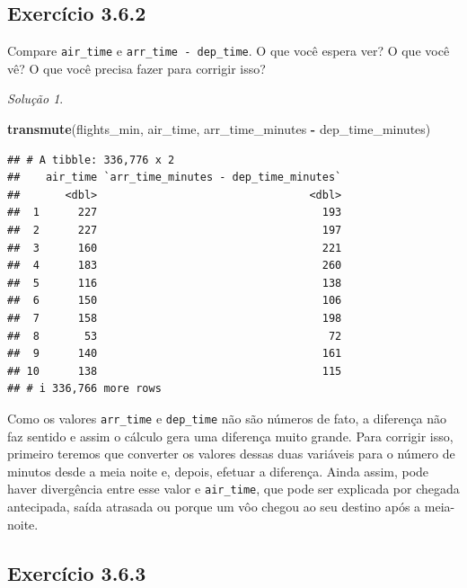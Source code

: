 \documentclass[
]{latex/krantz}
\newenvironment{Shaded}{\begin{snugshade}}{\end{snugshade}}
\newcommand{\FunctionTok}[1]{\textcolor[rgb]{0.13,0.29,0.53}{\textbf{#1}}}
\newcommand{\NormalTok}[1]{#1}
\newcommand{\SpecialCharTok}[1]{\textcolor[rgb]{0.81,0.36,0.00}{\textbf{#1}}}
\theoremstyle{definition}
\theoremstyle{definition}
\theoremstyle{definition}
\theoremstyle{definition}
\theoremstyle{remark}
\newtheorem*{solution}{Solução}
\begin{document}
\hypertarget{exr3-6-2}{%
\subsection*{Exercício 3.6.2}\label{exr3-6-2}}

Compare \texttt{air\_time} e \texttt{arr\_time\ -\ dep\_time}. O que você espera ver? O que você vê? O que você precisa fazer para corrigir isso?

\begin{solution}
\leavevmode

\begin{Shaded}
\begin{Highlighting}[]
\FunctionTok{transmute}\NormalTok{(flights\_min, air\_time, arr\_time\_minutes }\SpecialCharTok{{-}}\NormalTok{ dep\_time\_minutes)}
\end{Highlighting}
\end{Shaded}

\begin{verbatim}
## # A tibble: 336,776 x 2
##    air_time `arr_time_minutes - dep_time_minutes`
##       <dbl>                                 <dbl>
##  1      227                                   193
##  2      227                                   197
##  3      160                                   221
##  4      183                                   260
##  5      116                                   138
##  6      150                                   106
##  7      158                                   198
##  8       53                                    72
##  9      140                                   161
## 10      138                                   115
## # i 336,766 more rows
\end{verbatim}

Como os valores \texttt{arr\_time} e \texttt{dep\_time} não são números de fato, a diferença não faz sentido e assim o cálculo gera uma diferença muito grande. Para corrigir isso, primeiro teremos que converter os valores dessas duas variáveis para o número de minutos desde a meia noite e, depois, efetuar a diferença. Ainda assim, pode haver divergência entre esse valor e \texttt{air\_time}, que pode ser explicada por chegada antecipada, saída atrasada ou porque um vôo chegou ao seu destino após a meia-noite.

\end{solution}

\hypertarget{exr3-6-3}{%
\subsection*{Exercício 3.6.3}\label{exr3-6-3}}
\end{document}
